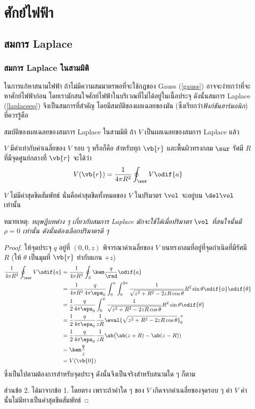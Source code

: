 \chapter{ศักย์ไฟฟ้า}
\section{สมการ Laplace}
\subsection{สมการ Laplace ในสามมิติ}
ในการแก้หาสนามไฟฟ้า ถ้าไม่มีความสมมาตรพอที่จะใช้กฎของ Gauss (\ref{gauss}) อาจจะง่ายกว่าที่จะหาศักย์ไฟฟ้าก่อน โดยเรามักสนใจศักย์ไฟฟ้าในบริเวณที่ไม่ได้อยู่ในเนื้อประจุ ดังนั้นสมการ Laplace (\ref{laplaceeq}) จึงเป็นสมการที่สำคัญ โดยมีสมบัติของผลเฉลยของมัน (ซึ่งเรียกว่า\emph{ฟังก์ชันฮาร์มอนิก}) ที่ควรรู้คือ
\begin{lawbox}{สมบัติของผลเฉลยของสมการ Laplace ในสามมิติ}
    ถ้า $V$ เป็นผลเฉลยของสมการ Laplace แล้ว
    \begin{compactenum}
        \item $V$ มีค่าเท่ากับค่าเฉลี่ยของ $V$ รอบ ๆ หรือก็คือ สำหรับทุก $\vb{r}$ และพื้นผิวทรงกลม $\sur$ รัศมี $R$ ที่มีจุดศูนย์กลางที่ $\vb{r}$ จะได้ว่า
        \begin{equation}
            V(\vb{r})=\frac{1}{4\pi R^2}\oint_\sur V\odif{a}
        \end{equation}
        \item $V$ ไม่มีค่าสุดขีดสัมพัทธ์ นั่นคือค่าสุดขีดทั้งหมดของ $V$ ในปริมาตร $\vol$ จะอยู่บน $\del\vol$ เท่านั้น
    \end{compactenum}
\end{lawbox}
หมายเหตุ: \emph{ทฤษฎีบทต่าง ๆ เกี่ยวกับสมการ Laplace มักจะใช้ได้เมื่อปริมาตร $\vol$ ที่สนใจนั้นมี $\rho=0$ เท่านั้น ดังนั้นต้องเลือกปริมาตรดี ๆ}
\begin{proof}
    ให้จุดประจุ $q$ อยู่ที่ $(0,0,z)$ พิจารณาค่าเฉลี่ยของ $V$ บนทรงกลมที่อยู่ที่จุดกำเนิดที่มีรัศมี $R$ (ให้ $\theta$ เป็นมุมที่ $\vb{r}$ ทำกับแกน $+z$)
    {\allowdisplaybreaks
    \begin{align*}
        \frac{1}{4\pi R^2}\oint_\sur V\odif{a}&=\frac{1}{4\pi R^2}\oint_S\kem\frac{q}{\rad}\odif{a}\\
        &=\frac{1}{4\pi R^2}\frac{q}{4\pi\eps_0}\int_0^\pi\int_0^{2\pi}\frac{1}{\sqrt{z^2+R^2-2zR\cos\theta}}R^2\sin\theta\odif{\phi}\odif{\theta}\\
        &=\frac{1}{2}\frac{q}{4\pi\eps_0}\int_0^\pi\frac{1}{\sqrt{z^2+R^2-2zR\cos\theta}}R^2\sin\theta\odif{\theta}\\
        &=\frac{1}{2}\frac{q}{4\pi\eps_0}\frac{1}{zR}\eval{\sqrt{z^2+R^2-2zR\cos\theta}}_0^\pi\\
        &=\frac{1}{2}\frac{q}{4\pi\eps_0}\frac{1}{zR}\ab\big(\ab(z+R)-\ab(z-R))\\
        &=\kem\frac{q}{z}\\
        &=V(\vb{0})
    \end{align*}
    }
    ซึ่งเป็นไปตามต้องการสำหรับจุดประจุ ดังนั้นจึงเป็นจริงสำหรับสนามใด ๆ ก็ตาม
    
    ส่วนข้อ 2. ได้มาจากข้อ 1. โดยตรง เพราะถ้าค่าใด ๆ ของ $V$ เกิดจากค่าเฉลี่ยของจุดรอบ ๆ ค่า $V$ ค่านั้นไม่มีทางเป็นค่าสุดขีดสัมพัทธ์
\end{proof}
